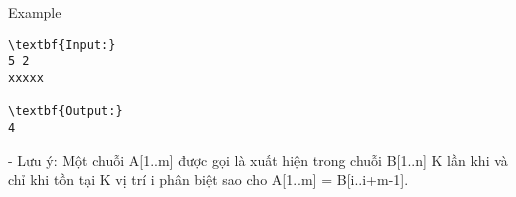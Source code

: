 Example
\begin{verbatim}
\textbf{Input:}
5 2
xxxxx

\textbf{Output:}
4
\end{verbatim}

- Lưu ý: Một chuỗi A[1..m] được gọi là xuất hiện trong chuỗi B[1..n] K lần khi và chỉ khi tồn tại K vị trí i phân biệt sao cho A[1..m] = B[i..i+m-1].